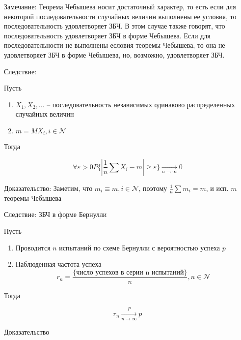 Замечание: Теорема Чебышева носит достаточный характер, то есть если для некоторой последовательности случайных величин выполнены ее условия, то последовательность удовлетворяет ЗБЧ. В этом случае также говорят, что последовательность удовлетворяет ЗБЧ в форме Чебышева. Если для последовательности не выполнены есловия теоремы Чебышева, то она не удовлетворяет ЗБЧ в форме Чебышева, но, возможно, удовлетворяет ЗБЧ.

Следствие:

Пусть

\begin{enumerate}
    \item $X_1, X_2, ...$ -- последовательность независимых одинаково распределенных случайных величин
    \item $m = MX_i, i \in \mathcal N$
\end{enumerate}

Тогда

\begin{equation*}
    \forall \varepsilon > 0 P\{ |\frac{1}{n} \sum X_i - m| \geq \varepsilon \}  \xrightarrow[n\to\infty]{} 0
\end{equation*}

Доказательство: Заметим, что $m_i \equiv m, i \in \mathcal N$, поэтому $\frac{1}{n} \sum m_i = m$, и исп. $m$ теоремы Чебышева

Следствие: ЗБЧ в форме Бернулли

Пусть

\begin{enumerate}
    \item Проводится $n$ испытаний по схеме Бернулли с вероятностью успеха $p$
    \item Наблюденная частота успеха
        \begin{equation*}
            r_n = \frac{\{\text{число успехов в серии n испытаний}\}}{n}, n \in \mathcal N
        \end{equation*}
\end{enumerate}

Тогда

\begin{equation*}
    r_n \xrightarrow[n\to\infty]{P} p
\end{equation*}

Доказательство

